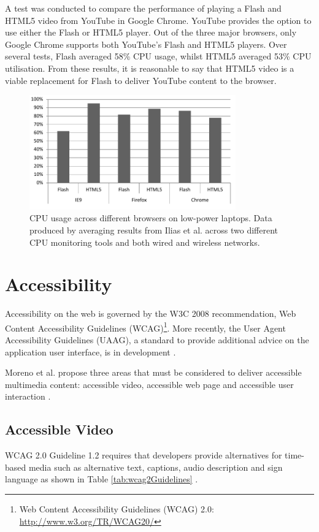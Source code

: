 \documentclass[journal]{IEEEtran}
\begin{document}
A test was conducted to compare the performance of playing a Flash and HTML5 video from YouTube in Google Chrome. YouTube provides the option to use either the Flash or HTML5 player. Out of the three major browsers, only Google Chrome supports both YouTube's Flash and HTML5 players. Over several tests, Flash averaged 58\% CPU usage, whilst HTML5 averaged 53\% CPU utilisation. From these results, it is reasonable to say that HTML5 video is a viable replacement for Flash to deliver YouTube content to the browser. 

\begin{figure}[!t]
\centering
\includegraphics[width=3.5in]{cpu-performance-graph}
\caption{CPU usage across different browsers on low-power laptops. Data produced by averaging results from Ilias et al. \cite{inproceedings:aStudyOfVideoPerformanceAnalysis} across two different CPU monitoring tools and both wired and wireless networks.}
\label{fig:cpuPerformanceGraph}
\end{figure} 

\section{Accessibility}
Accessibility on the web is governed by the W3C 2008 recommendation, Web Content Accessibility Guidelines (WCAG)\footnote{Web Content Accessibility Guidelines (WCAG) 2.0: \url{http://www.w3.org/TR/WCAG20/}}. More recently, the User Agent Accessibility Guidelines (UAAG), a standard to provide additional advice on the application user interface, is in development \cite{website:implementingUAAG}.

Moreno et al. propose three areas that must be considered to deliver accessible multimedia content: accessible video, accessible web page and accessible user interaction \cite{article:disablityStandardsForMultimediaOnTheWeb}.

\subsection{Accessible Video}
WCAG 2.0 Guideline 1.2 requires that developers provide alternatives for time-based media such as alternative text, captions, audio description and sign language as shown in Table \ref{tab:wcag2Guidelines} \cite{standard:wcag2}.
\end{document}
